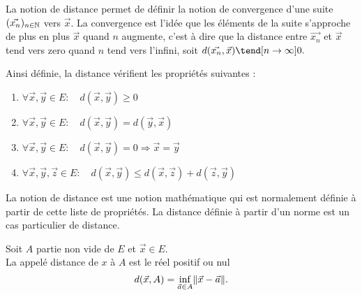 \documentclass{book}
\begin{document}
\begin{Remarque}[Distance]
La notion de distance permet de définir la notion de convergence d'une suite $(\vec{x_n})_{n\in\mathbb{N}}$ vers $\vec{x}$. La convergence est l'idée que les éléments de la suite s'approche de plus en plus $\vec{x}$ quand $n$ augmente, c'est à dire que la distance entre $\vec{x_n}$ et $\vec{x}$ tend vers zero quand $n$ tend vers l'infini, soit $d(\vec{x_n},\vec{x})\tend[n\to\infty]0.$ 
\end{Remarque}
\begin{Proposition}
Ainsi définie, la distance vérifient les propriétés suivantes :
\begin{enumerate}
\item {} $\forall \vec{x},\vec{y}\in E:\quad  d(\vec{x},\vec{y}) \geq  0$
\item {} $\forall \vec{x},\vec{y}\in E:\quad d(\vec{x},\vec{y}) = d(\vec{y},\vec{x})$
\item {} $\forall \vec{x},\vec{y}\in E:\quad  d(\vec{x},\vec{y}) = 0 \Rightarrow \vec{x} = \vec{y}$
\item {} $\forall \vec{x},\vec{y},\vec{z}\in E:\quad  d(\vec{x},\vec{y}) \leq d(\vec{x},\vec{z}) + d(\vec{z},\vec{y})$
\end{enumerate}
\end{Proposition}
\begin{Remarque}
La notion de distance est une notion mathématique qui est normalement définie à partir de cette liste de propriétés. La distance définie à partir d'un norme est un cas particulier de distance. 
\end{Remarque}
\begin{Definition}
Soit $A$ partie non vide de $E$ et $\vec{x}\in E$.\\
La  appelé distance de $x$ à $A$ est le réel positif ou nul
$$d (\vec{x}, A) = \inf_{\vec{a} \in A}  \mathopen\lVert \vec{x} - \vec{a} \mathclose\rVert.$$
\end{Definition}
\end{document}

